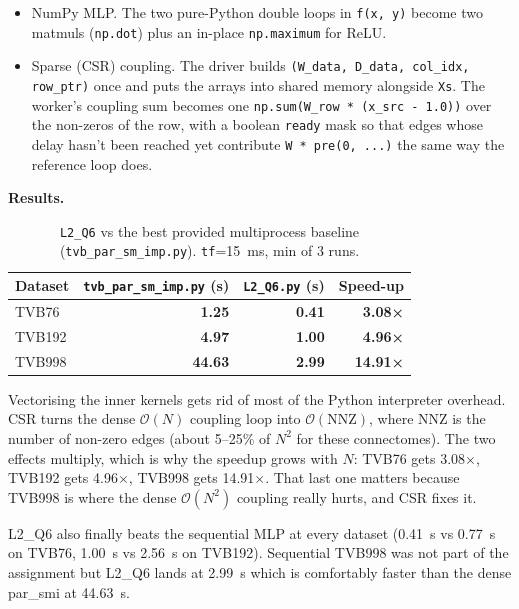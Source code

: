 \documentclass[11pt,a4paper]{article}
\begin{document}
\begin{itemize}
    \item NumPy MLP. The two pure-Python double loops in
    \texttt{f(x, y)} become two matmuls (\texttt{np.dot}) plus an
    in-place \texttt{np.maximum} for ReLU.
    \item Sparse (CSR) coupling. The driver builds
    \texttt{(W\_data, D\_data, col\_idx, row\_ptr)} once and puts the
    arrays into shared memory alongside \texttt{Xs}. The worker's
    coupling sum becomes one \texttt{np.sum(W\_row * (x\_src - 1.0))}
    over the non-zeros of the row, with a boolean \texttt{ready} mask
    so that edges whose delay hasn't been reached yet contribute
    \texttt{W * pre(0, ...)} the same way the reference loop does.
\end{itemize}

\textbf{Results.}

\begin{table}[h]
\centering
\small
\begin{tabular}{lrrr}
\toprule
Dataset & \texttt{tvb\_par\_sm\_imp.py} (s) & \texttt{L2\_Q6.py} (s) & Speed-up \\
\midrule
TVB76  & \textbf{1.25}  & \textbf{0.41}  & \textbf{3.08×} \\
TVB192 & \textbf{4.97} & \textbf{1.00} & \textbf{4.96×} \\
TVB998 & \textbf{44.63} & \textbf{2.99} & \textbf{14.91×} \\
\bottomrule
\end{tabular}
\caption{\texttt{L2\_Q6} vs the best provided multiprocess baseline
(\texttt{tvb\_par\_sm\_imp.py}). \texttt{tf}=15~ms, min of 3 runs.}
\end{table}

Vectorising the inner kernels gets rid of most of the Python
interpreter overhead. CSR turns the dense $\mathcal{O}(N)$ coupling
loop into $\mathcal{O}(\text{NNZ})$, where NNZ is the number of
non-zero edges (about 5--25\% of $N^2$ for these connectomes). The
two effects multiply, which is why the speedup grows with $N$:
TVB76 gets 3.08$\times$, TVB192 gets 4.96$\times$, TVB998 gets
14.91$\times$. That last one matters because TVB998 is where the
dense $\mathcal{O}(N^2)$ coupling really hurts, and CSR fixes it.

L2\_Q6 also finally beats the sequential MLP at every dataset
(0.41~s vs 0.77~s on TVB76, 1.00~s vs 2.56~s on TVB192). Sequential
TVB998 was not part of the assignment but L2\_Q6 lands at 2.99~s
which is comfortably faster than the dense par\_smi at 44.63~s.
\end{document}
